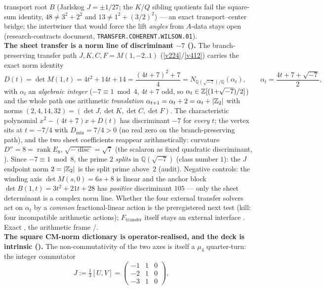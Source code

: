 \begin{keybox}
transport root $B$ (Jarlskog $J=\pm1/27$; the $K$/$Q$ sibling quotients fail the square-sum identity,
$48\neq3^2{+}2^2$ and $13\neq1^2{+}(3/2)^2$) --- an exact transport--center bridge; the intertwiner that
would force the lift \emph{angles} from $A$-data stays open (research-contracts document,
\texttt{TRANSFER.COHERENT.WILSON.01}).
\smallskip\\
\noindent\textbf{The sheet transfer is a norm line of discriminant $-7$
().} The branch-preserving transfer path $J,K,C,F=M(1,-2..1)$
(\vref{v224}/\vref{v412}) carries the exact norm identity
\[
  D(t)=\det M(1,t)=4t^2+14t+14=\frac{(4t+7)^2+7}{4}
      =N_{\mathbb Q(\sqrt{-7})/\mathbb Q}(\alpha_t),\qquad \alpha_t=\frac{4t+7+\sqrt{-7}}2,
\]
with $\alpha_t$ an \emph{algebraic integer} ($-7\equiv1\bmod4$, $4t{+}7$ odd, so
$\alpha_t\in\mathbb{Z}[(1{+}\sqrt{-7})/2]$) and the whole path one arithmetic \emph{translation}
$\alpha_{t+1}=\alpha_t+2=\alpha_t+|\mathbb{Z}_2|$ with norms $(2,4,14,32)=(\det J,\det K,\det C,\det F)$. The
characteristic polynomial $x^2-(4t{+}7)x+D(t)$ has discriminant $-7$ for \emph{every} $t$; the vertex sits
at $t=-7/4$ with $D_{\min}=7/4>0$ (no real zero on the branch-preserving path), and the two sheet
coefficients reappear arithmetically: curvature $D''=8=\operatorname{rank}E_8$, $\sqrt{-\operatorname{disc}}
=\sqrt7$ (the scalaron as fixed quadratic discriminant, \mC). Since $-7\equiv1\bmod 8$, the prime $2$
\emph{splits} in $\mathbb Q(\sqrt{-7})$ (class number $1$): the $J$ endpoint norm $2=|\mathbb{Z}_2|$ is the split prime
above~$2$ (audit). Negative controls: the winding axis $\det M(s,0)=6s{+}8$ is linear and the anchor block
$\det B(1,t)=3t^2{+}21t{+}28$ has \emph{positive} discriminant $105$ --- only the sheet determinant is a
complex norm line. Whether the four external transfer solvers act on $\alpha_t$ by a \emph{common}
fractional-linear action is the preregistered next test (kill: four incompatible arithmetic actions);
$F_{\mathrm{transfer}}$ itself stays an external interface \mO. Exact \mE, the arithmetic frame \mC/\mO.
\smallskip\\
\noindent\textbf{The square CM-norm dictionary is operator-realised, and the deck is intrinsic
().} The non-commutativity of the two axes is itself a $\mu_4$
quarter-turn: the integer commutator
\[
  J:=\tfrac13[U,V]=\begin{pmatrix}-1&1&0\\-2&1&0\\-3&1&0\end{pmatrix},\qquad
\]
\end{keybox}
